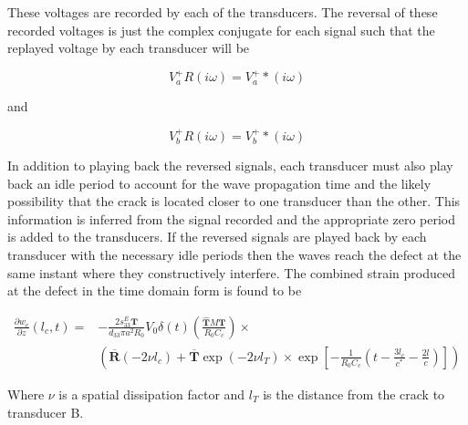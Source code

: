 

These voltages are recorded by each of the transducers. The reversal of these recorded voltages is just the complex conjugate for each signal such that the replayed voltage by each transducer will be

\begin{equation}
V^+_a{R}(i\omega) = V^+_a*(i\omega)
\end{equation} 

and

\begin{equation}
V^+_b{R}(i\omega) = V^+_b*(i\omega)
\end{equation} 



In addition to playing back the reversed signals, each transducer must also play back an idle period to account for the wave propagation time and the likely possibility that the crack is located closer to one transducer than the other. This information is inferred from the signal recorded and the appropriate zero period is added to the transducers. If the reversed signals are played back by each transducer with the necessary idle periods then the waves reach the defect at the same instant where they constructively interfere. The combined strain produced at the defect in the time domain form is found to be

\begin{equation}
\begin{split}
\frac{\partial w_c}{\partial z}(l_c, t) = &-\frac{2s^E_{33}\boldsymbol{T}}{d_{33} \pi a^2 R_0}V_0\delta (t) \left(\frac{\boldsymbol{\hat{T}}M \boldsymbol{T}}{R_0 C_c}\right) \times \\ &\left(\overline{\boldsymbol{R}} (-2 \nu l_c) + \overline{\boldsymbol{T}} \exp(-2 \nu l_T) \times \exp \left[-\frac{1}{R_0 C_c} \left(t - \frac{3l_c}{c^*} - \frac{2l}{c}\right)\right]\right)
\end{split}
\end{equation}

Where $\nu$ is a spatial dissipation factor and $l_T$ is the distance from the crack to transducer B.

